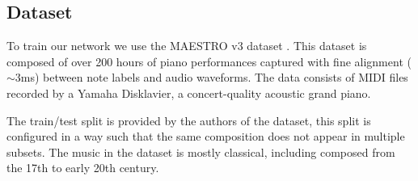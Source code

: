 \documentclass[11pt, twocolumn]{article}
\begin{document}
\subsection{Dataset}
To train our network we use the MAESTRO v3 dataset \cite{hawthorne2018enabling}. This dataset is composed of over 200 hours of piano performances captured with fine alignment ($\sim$3ms) between note labels and audio waveforms. The data consists of MIDI files recorded by a Yamaha Disklavier, a concert-quality acoustic grand piano. 
\par
The train/test split is provided by the authors of the dataset, this split is configured in a way such that the same composition does not appear in multiple subsets. The music in the dataset is mostly classical, including composed from the 17th to early 20th century.
\end{document}
